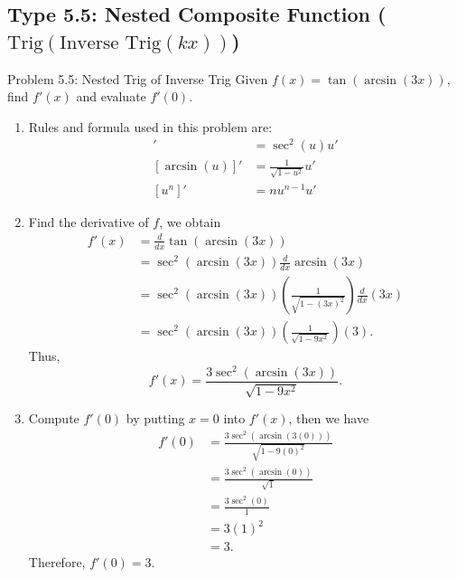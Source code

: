 \documentclass[11pt,a4paper]{article}
\begin{document}
\subsection{Type 5.5: Nested Composite Function ($\text{Trig}(\text{Inverse Trig}(kx))$)}
\begin{problembox}{Problem 5.5: Nested Trig of Inverse Trig}
Given $f(x) = \tan(\arcsin(3x))$, find $f'(x)$ and evaluate $f'(0)$.
\end{problembox}
\begin{solutionbox}
\begin{enumerate}
	\item [Step 1.] Rules and formula used in this problem are:
	\begin{align*}
		[\tan(u)]' &= \sec^2(u) u' \\
		[\arcsin(u)]' &= \frac{1}{\sqrt{1-u^2}} u' \\
		[u^n]' &= n u^{n-1} u'
	\end{align*}
	
	\item [Step 2.] Find the derivative of $f$, we obtain
	\begin{align*}
		f'(x) &= \frac{d}{dx} \tan(\arcsin(3x)) \\
		&= \sec^2(\arcsin(3x)) \frac{d}{dx} \arcsin(3x) \\
		&= \sec^2(\arcsin(3x)) \left( \frac{1}{\sqrt{1-(3x)^2}} \right) \frac{d}{dx} (3x) \\
		&= \sec^2(\arcsin(3x)) \left( \frac{1}{\sqrt{1-9x^2}} \right) (3).
	\end{align*}
	Thus,
	\begin{equation*}
		f'(x) = \frac{3\sec^2(\arcsin(3x))}{\sqrt{1-9x^2}}.
	\end{equation*}
	
	\item [Step 3.] Compute $f'(0)$ by putting $x = 0$ into $f'(x)$, then we have
	\begin{align*}
		f'(0) &= \frac{3\sec^2(\arcsin(3(0)))}{\sqrt{1-9(0)^2}} \\
		&= \frac{3\sec^2(\arcsin(0))}{\sqrt{1}} \\
		&= \frac{3\sec^2(0)}{1} \\
		&= 3(1)^2 \\
		&= 3.
	\end{align*}
	Therefore, $f'(0) = 3$.
\end{enumerate}
\end{solutionbox}
\end{document}
